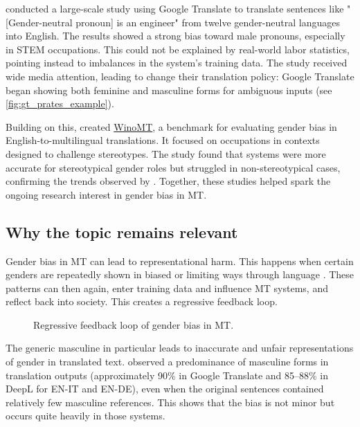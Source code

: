        \textcite{pratesAssessingGenderBias2019} conducted a large-scale study using Google Translate to translate sentences like "[Gender-neutral pronoun] is an engineer" from twelve gender-neutral languages into English. The results showed a strong bias toward male pronouns, especially in STEM occupations. This could not be explained by real-world labor statistics, pointing instead to imbalances in the system's training data. The study received wide media attention, leading \citeauthor{googleReducingGenderBias2018} to change their translation policy: Google Translate began showing both feminine and masculine forms for ambiguous inputs \parencite{googleReducingGenderBias2018} (see \autoref{fig:gt_prates_example}).

        Building on this, \textcite{stanovskyEvaluatingGenderBias2019} created \href{https://github.com/gabrielStanovsky/mt_gender}{WinoMT}, a benchmark for evaluating gender bias in English-to-multilingual translations. It focused on occupations in contexts designed to challenge stereotypes. The study found that systems were more accurate for stereotypical gender roles but struggled in non-stereotypical cases, confirming the trends observed by \citeauthor{pratesAssessingGenderBias2019}.
        Together, these studies helped spark the ongoing research interest in gender bias in MT.

    \subsection{Why the topic remains relevant }
        Gender bias in MT can lead to representational harm. This happens when certain genders are repeatedly shown in biased or limiting ways through language \parencite{stanczakSurveyGenderBias2021}. These patterns can then again, enter training data and influence MT systems, and reflect back into society. This creates a regressive feedback loop.

        \vspace{1cm} 
        \begin{figure}[htb]
            \centering
            \scalebox{0.8}{}
            \caption{Regressive feedback loop of gender bias in MT.}
            \label{fig:regressive_feedback_loop}
        \end{figure}
        \vspace{1cm} 

        The generic masculine in particular leads to inaccurate and unfair representations of gender in translated text. \textcite{rescignoGenderBiasMachine2023} observed a predominance of masculine forms in translation outputs (approximately 90\% in Google Translate and 85–88\% in DeepL for EN-IT and EN-DE), even when the original sentences contained relatively few masculine references. This shows that the bias is not minor but occurs quite heavily in those systems.

